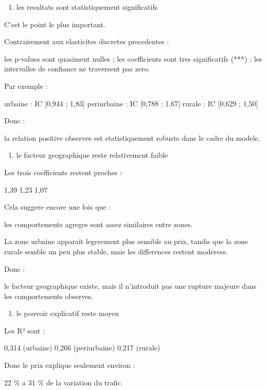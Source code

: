 \documentclass[
]{article}
\providecommand{\tightlist}{%
  \setlength{\itemsep}{0pt}\setlength{\parskip}{0pt}}
\begin{document}
\begin{enumerate}
\def\labelenumi{\arabic{enumi}.}
\setcounter{enumi}{1}
\tightlist
\item
  les resultats sont statistiquement significatifs
\end{enumerate}

C'est le point le plus important.

Contrairement aux elasticites discretes precedentes :

les p-values sont quasiment nulles ; les coefficients sont tres
significatifs (***) ; les intervalles de confiance ne traversent pas
zero.

Par exemple :

urbaine : IC {[}0,944 ; 1,83{]} periurbaine : IC {[}0,788 ; 1,67{]}
rurale : IC {[}0,629 ; 1,50{]}

Donc :

la relation positive observee est statistiquement robuste dans le cadre
du modele.

\begin{enumerate}
\def\labelenumi{\arabic{enumi}.}
\setcounter{enumi}{2}
\tightlist
\item
  le facteur geographique reste relativement faible
\end{enumerate}

Les trois coefficients restent proches :

1,39 1,23 1,07

Cela suggere encore une fois que :

les comportements agreges sont assez similaires entre zones.

La zone urbaine apparait legerement plus sensible au prix, tandis que la
zone rurale semble un peu plus stable, mais les differences restent
moderees.

Donc :

le facteur geographique existe, mais il n'introduit pas une rupture
majeure dans les comportements observes.

\begin{enumerate}
\def\labelenumi{\arabic{enumi}.}
\setcounter{enumi}{3}
\tightlist
\item
  le pouvoir explicatif reste moyen
\end{enumerate}

Les R² sont :

0,314 (urbaine) 0,266 (periurbaine) 0,217 (rurale)

Donc le prix explique seulement environ :

22 \% a 31 \% de la variation du trafic.
\end{document}
